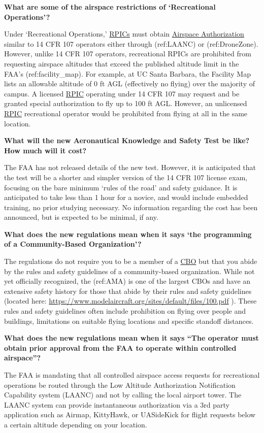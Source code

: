 \documentclass[
]{book}
\begin{document}
\textbf{What are some of the airspace restrictions of `Recreational Operations'?}

Under `Recreational Operations,' \protect\hyperlink{RPIC}{RPICs} must obtain \protect\hyperlink{AA}{Airspace Authorization} similar to 14 CFR 107 operators either through (ref:LAANC) or (ref:DroneZone). However, unlike 14 CFR 107 operators, recreational RPICs are prohibited from requesting airspace altitudes that exceed the published altitude limit in the FAA's (ref:facility\_map). For example, at UC Santa Barbara, the Facility Map lists an allowable altitude of 0 ft AGL (effectively no flying) over the majority of campus. A licensed \protect\hyperlink{RPIC}{RPIC} operating under 14 CFR 107 may request and be granted special authorization to fly up to 100 ft AGL. However, an unlicensed \protect\hyperlink{RPIC}{RPIC} recreational operator would be prohibited from flying at all in the same location.

\textbf{What will the new Aeronautical Knowledge and Safety Test be like? How much will it cost?}

The FAA has not released details of the new test. However, it is anticipated that the test will be a shorter and simpler version of the 14 CFR 107 license exam, focusing on the bare minimum `rules of the road' and safety guidance. It is anticipated to take less than 1 hour for a novice, and would include embedded training, no prior studying necessary. No information regarding the cost has been announced, but is expected to be minimal, if any.

\textbf{What does the new regulations mean when it says `the programming of a Community-Based Organization'?}

The regulations do not require you to be a member of a \protect\hyperlink{CBO}{CBO} but that you abide by the rules and safety guidelines of a community-based organization. While not yet officially recognized, the (ref:AMA) is one of the largest CBOs and have an extensive safety history for those that abide by their rules and safety guidelines (located here: \url{https://www.modelaircraft.org/sites/default/files/100.pdf} ). These rules and safety guidelines often include prohibition on flying over people and buildings, limitations on suitable flying locations and specific standoff distances.

\textbf{What does the new regulations mean when it says ``The operator must obtain prior approval from the FAA to operate within controlled airspace''?}

The FAA is mandating that all controlled airspace access requests for recreational operations be routed through the Low Altitude Authorization Notification Capability system (LAANC) and not by calling the local airport tower. The LAANC system can provide instantaneous authorization via a 3rd party application such as Airmap, KittyHawk, or UASideKick for flight requests below a certain altitude depending on your location.
\end{document}
